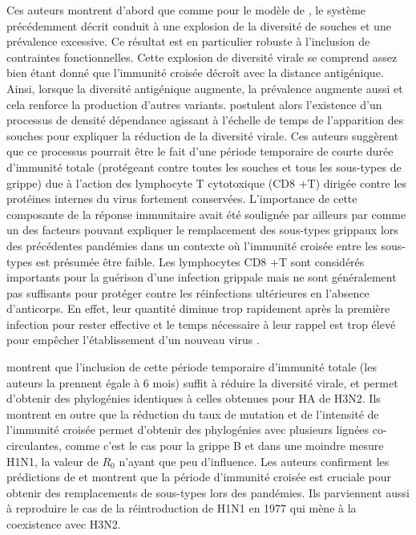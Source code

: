 Ces auteurs montrent d'abord que comme pour le modèle de
\citet{Girvan2002}, le système précédemment décrit conduit à une
explosion de la diversité de souches et une prévalence excessive. Ce
résultat est en particulier robuste à l'inclusion de contraintes
fonctionnelles. Cette explosion de diversité virale se comprend assez
bien étant donné que l'immunité croisée décroît avec la distance
antigénique. Ainsi, lorsque la diversité antigénique augmente, la
prévalence augmente aussi et cela renforce la production d'autres
variants. \citet{Ferguson2003} postulent alors l'existence d'un
processus de densité dépendance agissant à l'échelle de temps de
l'apparition des souches pour expliquer la réduction de la diversité
virale. Ces auteurs suggèrent que ce processus pourrait être le fait
d'une période temporaire de courte durée d'immunité totale (protégeant
contre toutes les souches et tous les sous-types de grippe) due à
l'action des lymphocyte T cytotoxique (CD8 +T) dirigée contre les
protéines internes du virus fortement conservées. L'importance de
cette composante de la réponse immunitaire avait été soulignée par
ailleurs par \citet{Webster1992} comme un des facteurs pouvant
expliquer le remplacement des sous-types grippaux lors des précédentes
pandémies dans un contexte où l'immunité croisée entre les sous-types
est présumée être faible. Les lymphocytes CD8 +T sont considérés
importants pour la guérison d'une infection grippale mais ne sont
généralement pas suffisants pour protéger contre les réinfections
ultérieures en l'absence d'anticorps. En effet, leur quantité diminue
trop rapidement après la première infection pour rester effective et
le temps nécessaire à leur rappel est trop élevé pour empêcher
l'établissement d'un nouveau virus \citep{Grebe2008}.

\citet{Ferguson2003} montrent que l'inclusion de cette période
temporaire d'immunité totale (les auteurs la prennent égale à 6 mois)
suffit à réduire la diversité virale, et permet d'obtenir des
phylogénies identiques à celles obtenues pour HA de H3N2. Ils montrent
en outre que la réduction du taux de mutation et de l'intensité de
l'immunité croisée permet d'obtenir des phylogénies avec plusieurs
lignées co-circulantes, comme c'est le cas pour la grippe B et dans
une moindre mesure H1N1, la valeur de $R_0$ n'ayant que peu
d'influence. Les auteurs confirment les prédictions de
\citet{Webster1992} et montrent que la période d'immunité croisée est
cruciale pour obtenir des remplacements de sous-types lors des
pandémies. Ils parviennent aussi à reproduire le cas de la
réintroduction de H1N1 en 1977 qui mène à la coexistence avec H3N2.


